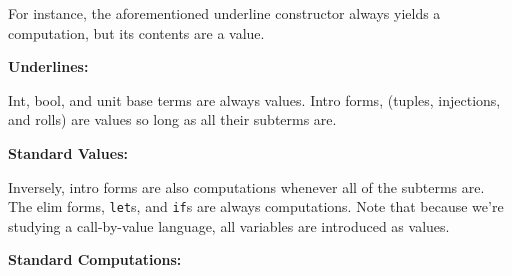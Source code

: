 \documentclass[]{article}
\begin{document}
\begin{abstrsyn}
For instance, the aforementioned underline constructor always yields a computation,
but its contents are a value.

\begin{framed}
\noindent\textbf{Underlines:}
\end{framed}

Int, bool, and unit base terms are always values.  
Intro forms, (tuples, injections, and rolls) are values so long as all their subterms are.

\begin{framed}
\noindent\textbf{Standard Values:}
\end{framed}

Inversely, intro forms are also computations whenever all of the subterms are.
The elim forms, {\tt let}s, and {\tt if}s are always computations.
Note that because we're studying a call-by-value language, all variables are introduced as values.

\begin{framed}
\noindent\textbf{Standard Computations:}
\end{framed}


\end{abstrsyn}
\end{document}
